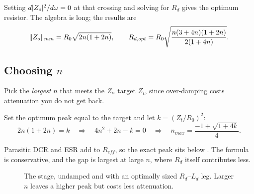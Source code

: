 Setting $d\lvert Z_o\rvert^2/d\omega = 0$ at that crossing and solving for $R_d$
gives the optimum resistor. The algebra is long; the results are
\begin{equation}\label{eq:rd-ld-opt}
	\lVert Z_o\rVert_{mm} = R_0\sqrt{2n(1+2n)}, \qquad
	R_{d,opt} = R_0\sqrt{\frac{n(3+4n)(1+2n)}{2(1+4n)}}.
\end{equation}

\subsection{Choosing \texorpdfstring{$n$}{n}}

Pick the \emph{largest} $n$ that meets the $Z_o$ target $Z_t$, since
over-damping costs attenuation you do not get back.

\begin{derivation}
	Set the optimum peak equal to the target and let $k = (Z_t/R_0)^2$:
	\[
		2n(1+2n) = k \quad\Rightarrow\quad 4n^2 + 2n - k = 0
		\quad\Rightarrow\quad
		n_{max} = \frac{-1 + \sqrt{1 + 4k}}{4}.
	\]
\end{derivation}

Parasitic DCR and ESR add to $R_{eff}$, so the exact peak sits below
. The formula is conservative, and the gap is largest
at large $n$, where $R_d$ itself contributes less.

\begin{figure}[ht]
	\centering
	\caption{The  stage, undamped and with an optimally sized
		$R_d$--$L_d$ leg. Larger $n$ leaves a higher peak but costs less attenuation.}
	\label{fig:single-stage-zo}
\end{figure}

